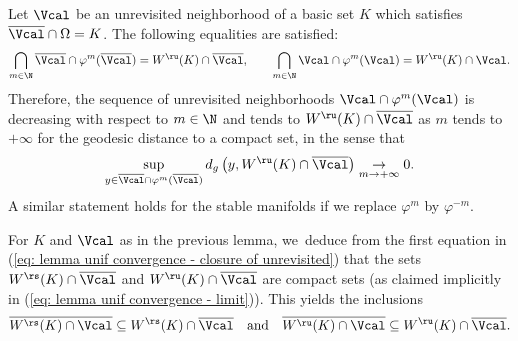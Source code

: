 \begin{lemma}\label{lemme: cv nonrevisite vers variete stable et instable}
Let $\Vcal$ be an unrevisited neighborhood of a basic set $K$ which satisfies $\overline{\Vcal} \cap \Omega = K$. The following equalities are satisfied:
\begin{equation}\label{eq: lemma unif convergence - closure of unrevisited}
\bigcap_{m \in \N} \overline{\Vcal} \cap \varphi^m (\overline{\Vcal}) = W^\ru (K) \cap \overline{\Vcal}, \qquad \bigcap_{m \in \N} \Vcal \cap \varphi^m (\Vcal) = W^\ru (K) \cap \Vcal.
\end{equation}
Therefore, the sequence of unrevisited neighborhoods $\Vcal \cap \varphi^m (\Vcal)$ is decreasing with respect to $m \in \N$ and tends to $W^\ru (K) \cap \overline{\Vcal}$ as $m$ tends to $+ \infty$ for the geodesic distance to a compact set, in the sense that
\begin{equation}\label{eq: lemma unif convergence - limit}
\sup_{y \in \overline{\Vcal} \cap \varphi^{m} (\overline{\Vcal})} d_g \left(y, W^{\ru} (K) \cap \overline{\Vcal} \right) \underset{m \to + \infty}{\to} 0.
\end{equation}
A similar statement holds for the stable manifolds if we replace $\varphi^{m}$ by $\varphi^{-m}$.
\end{lemma}

\begin{remark}\label{lemma: clos. of stable man on unrevisited neigh.}
For $K$ and $\Vcal$ as in the previous lemma, we~deduce from the first equation in (\ref{eq: lemma unif convergence - closure of unrevisited}) that the sets $ W^\rs (K) \cap \overline{\Vcal} $ and $W^\ru (K) \cap \overline{\Vcal} $ are compact sets (as claimed implicitly in (\ref{eq: lemma unif convergence - limit})). This yields the inclusions
\[
\overline{W^\rs (K) \cap \Vcal} \subseteq W^\rs (K) \cap \overline{\Vcal} \quad \text{and} \quad \overline{W^\ru (K) \cap \Vcal} \subseteq W^\ru (K) \cap \overline{\Vcal}.
\]
\end{remark}

